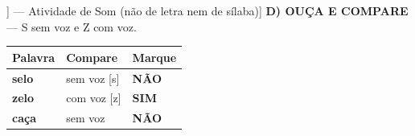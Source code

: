 \begin{exercicio}[Som /s/ [[s]] --- Atividade de Som (não de letra nem de sílaba)]
\textbf{D) OUÇA E COMPARE} --- S sem voz e Z com voz.

\begin{center}
\begin{tabular}{@{}p{4.2cm}p{6.2cm}p{1.6cm}@{}}
\hline
\textbf{Palavra} & \textbf{Compare} & \textbf{Marque} \\
\hline
\textbf{selo} & sem voz [s] & \textbf{NÃO} \\
\textbf{zelo} & com voz [z] & \textbf{SIM} \\
\textbf{caça} & sem voz & \textbf{NÃO} \\
\hline
\end{tabular}
\end{center}

\end{exercicio}

